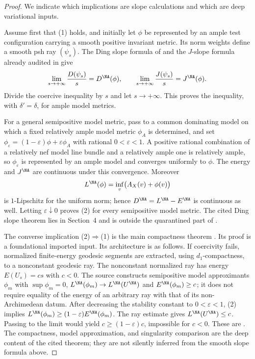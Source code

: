 \begin{proof}
We indicate which implications are slope calculations and which are deep
variational inputs.

Assume first that (1) holds, and initially let $\phi$ be represented by
an ample test configuration carrying a smooth positive invariant metric.
Its norm weights define a smooth psh ray $(\psi_s)$.  The Ding slope
formula of \cite[Theorem~4.3]{BHJ19} and the $J$-slope formula already
audited in  give
\[
 \lim_{s\to+\infty}\frac{D(\psi_s)}s=D^{\NA}(\phi),
 \qquad
 \lim_{s\to+\infty}\frac{J(\psi_s)}s=J^{\NA}(\phi).
\]
Divide the coercive inequality by $s$ and let $s\to+\infty$.  This
proves the inequality, with $\delta'=\delta$, for ample model metrics.

For a general semipositive model metric, pass to a common dominating model
on which a fixed relatively ample model metric $\phi_A$ is determined,
and set
$\phi_\varepsilon=(1-\varepsilon)\phi+\varepsilon\phi_A$
with rational $0<\varepsilon<1$.  A positive rational combination of a
relatively nef model line bundle and a relatively ample one is relatively
ample, so $\phi_\varepsilon$ is represented by an ample model and
converges uniformly to $\phi$.  The energy and
$J^{\NA}$ are continuous under this convergence.  Moreover
\[
 L^{\NA}(\phi)=\inf_v\bigl(A_X(v)+\phi(v)\bigr)
\]
is $1$-Lipschitz for the uniform norm; hence
$D^{\NA}=L^{\NA}-E^{\NA}$ is continuous as well.  Letting
$\varepsilon\downarrow0$ proves (2) for every semipositive model metric.
The cited Ding slope theorem lies in Section~4 and is outside the
quarantined part of \cite{BHJ19}.

The converse implication (2)$\Rightarrow$(1) is the main compactness
theorem \cite[Theorem~5.1]{BBJ21}.  Its proof is a foundational imported
input.  Its architecture is as follows.  If coercivity fails, normalized
finite-energy geodesic segments are extracted, using $d_1$-compactness,
to a nonconstant geodesic ray.  The nonconstant normalized ray has energy $E(U_s)=cs$ with $c<0$.
The source constructs semipositive model approximants $\phi_m$ with
$\sup\phi_m=0$, $L^{\NA}(\phi_m)\to L^{\NA}(U^{\NA})$ and
$E^{\NA}(\phi_m)\geq c$; it does not require equality of the energy of
an arbitrary ray with that of its non-Archimedean datum. After decreasing
the stability constant to $0<\varepsilon<1$, (2) implies
$L^{\NA}(\phi_m)\geq(1-\varepsilon)E^{\NA}(\phi_m)$.
The ray estimate gives $L^{\NA}(U^{\NA})\leq c$. Passing to the limit
would yield $c\geq(1-\varepsilon)c$, impossible for $c<0$.
These are \cite[Lemmas~5.7--5.8 and the proof of Theorem~5.1]{BBJ21}.  The compactness, model approximation, and singularity
comparison are the deep content of the cited theorem; they are not
silently inferred from the smooth slope formula above.


\end{proof}
